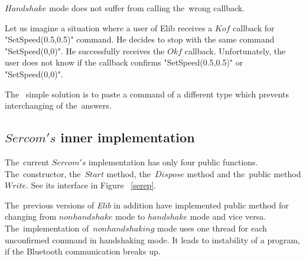   $Handshake$ mode does not suffer from calling the~wrong callback. 

  \begin{example}
  Let us imagine a situation where a user of Elib receives a $Kof$ callback for "SetSpeed(0.5,0.5)" command.
  He decides to stop with the same command "SetSpeed(0,0)". He successfully receives the $Okf$ callback.
  Unfortunately, the user does not know if the callback confirms "SetSpeed(0.5,0.5)" or "SetSpeed(0,0)".
  \end{example}
  The~ simple solution is to paste a command of a different type which prevents interchanging of the~answers.

\subsection{$Sercom's$ inner implementation}\label{sec:versions}
  The~current $Sercom's$ implementation has only four public functions.
  The~constructor, the~$Start$ method, the~$Dispose$ method and the~public method $Write$. 
  See its interface in Figure ~\ref{serep}.	

  The~previous versions of {\it Elib} in addition have implemented public 
  method for changing from $nonhandshake$ mode to 
  $handshake$ mode and vice versa.
  The~implementation of~$nonhandshaking$ mode uses one 
  thread for each unconfirmed command in handshaking mode.
  It leads to instability of a program, if the Bluetooth communication breaks up.
  
